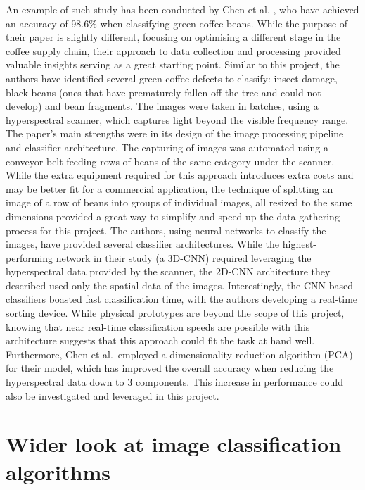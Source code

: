 An example of such study has been conducted by Chen et al. \cite{hyperspectralChen}, who have achieved an accuracy of
98.6\% when classifying green coffee beans.
While the purpose of their paper is slightly different, focusing on optimising a different stage in the coffee supply chain,
their approach to data collection and processing provided valuable insights serving as a great starting point.
Similar to this project, the authors have identified several green coffee defects to classify: insect damage,
black beans (ones that have prematurely fallen off the tree and could not develop) and bean fragments.
The images were taken in batches, using a hyperspectral scanner,
which captures light beyond the visible frequency range.
The paper's main strengths were in its design of the image processing pipeline and classifier architecture.
The capturing of images was automated using a conveyor belt feeding rows of beans of the same category under the scanner.
While the extra equipment required for this approach introduces extra costs and may be better fit for a commercial application,
the technique of splitting an image of a row of beans into groups of individual images,
all resized to the same dimensions provided a great way to simplify and speed up the data gathering process for this project.
The authors, using neural networks to classify the images, have provided several classifier architectures.
While the highest-performing network in their study (a 3D-CNN) required leveraging the hyperspectral data provided by the scanner,
the 2D-CNN architecture they described used only the spatial data of the images.
Interestingly, the CNN-based classifiers boasted fast classification time, with the authors developing a real-time sorting device.
While physical prototypes are beyond the scope of this project, knowing that near real-time classification speeds are
possible with this architecture suggests that this approach could fit the task at hand well.
Furthermore, Chen et al.\ employed a dimensionality reduction algorithm (PCA) for their model, which has improved the overall accuracy
when reducing the hyperspectral data down to 3 components.
This increase in performance could also be investigated and leveraged in this project.




\section{Wider look at image classification algorithms}
\label{sec:lit-review-general}